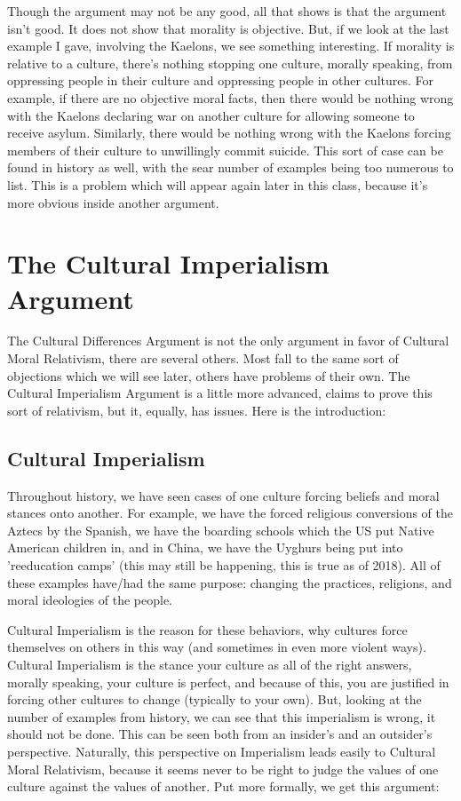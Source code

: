 Though the argument may not be any good, all that shows is that the argument isn't good. It does not show that morality is objective. But, if we look at the last example I gave, involving the Kaelons, we see something interesting. If morality is relative to a culture, there's nothing stopping one culture, morally speaking, from oppressing people in their culture and oppressing people in other cultures. For example, if there are no objective moral facts, then there would be nothing wrong with the Kaelons declaring war on another culture for allowing someone to receive asylum. Similarly, there would be nothing wrong with the Kaelons forcing members of their culture to unwillingly commit suicide. This sort of case can be found in history as well, with the sear number of examples being too numerous to list. This is a problem which will appear again later in this class, because it's more obvious inside another argument.  

\section{The Cultural Imperialism Argument}

The Cultural Differences Argument is not the only argument in favor of Cultural Moral Relativism, there are several others. Most fall to the same sort of objections which we will see later, others have problems of their own. The Cultural Imperialism Argument is a little more advanced, claims to prove this sort of relativism, but it, equally, has issues.  Here is the introduction:

\subsection{Cultural Imperialism}

Throughout history, we have seen cases of one culture forcing beliefs and moral stances onto another. For example, we have the forced religious conversions of the Aztecs by the Spanish, we have the boarding schools which the US put Native American children in, and in China, we have the Uyghurs being put into 'reeducation camps' (this may still be happening, this is true as of 2018). All of these examples have/had the same purpose: changing the practices, religions, and moral ideologies of the people.  

Cultural Imperialism is the reason for these behaviors, why cultures force themselves on others in this way (and sometimes in even more violent ways). Cultural Imperialism is the stance your culture as all of the right answers, morally speaking, your culture is perfect, and because of this, you are justified in forcing other cultures to change (typically to your own). But, looking at the number of examples from history, we can see that this imperialism is wrong, it should not be done. This can be seen both from an insider's and an outsider's perspective. Naturally, this perspective on Imperialism leads easily to Cultural Moral Relativism, because it seems never to be right to judge the values of one culture against the values of another. Put more formally, we get this argument:


